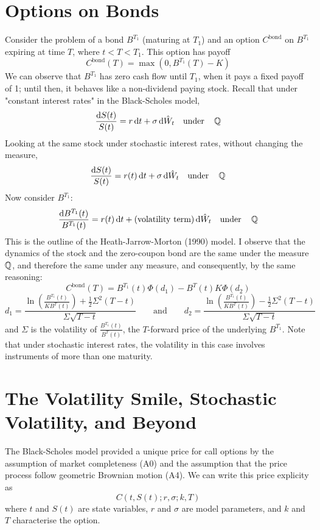 \documentclass[11pt]{article}
\begin{document}
\section{Options on Bonds}

Consider the problem of a bond $B^{T_1}$ (maturing at $T_1$) and an option $C^\text{bond}$ on $B^{T_1}$ expiring at time $T$, where $t < T < T_1$. This option has payoff 
$$C^\text{bond}(T) = \max\left( 0, B^{T_1}(T) - K\right)$$
We can observe that $B^{T_1}$ has zero cash flow until $T_1$, when it pays a fixed payoff of 1; until then, it behaves like a non-dividend paying stock. Recall that under "constant interest rates" in the Black-Scholes model,
$$\frac{\dif S(t)}{S(t)} = r \dif t + \sigma \dif\hat{W}_t \quad \text{under} \quad \Qmeas$$
Looking at the same stock under stochastic interest rates, without changing the measure,
$$\frac{\dif S(t)}{S(t)} = r(t) \dif t + \sigma \dif\hat{W}_t \quad \text{under} \quad \Qmeas$$
Now consider $B^{T_1}$:
$$\frac{\dif B^{T_1}(t)}{B^{T_1}(t)} = r(t) \dif t + \text{(volatility term)} \dif\hat{W}_t \quad \text{under} \quad \Qmeas$$
This is the outline of the Heath-Jarrow-Morton (1990) model.  I observe that the dynamics of the stock and the zero-coupon bond are the same under the measure $\operatorname{\mathbb Q}$, and therefore the same under any measure, and consequently, by the same reasoning:
$$C^\text{bond}(T) = B^{T_1}(t) \Phi(d_1) - B^{T}(t) K \Phi(d_2)$$
$$d_1 = \frac{\ln \left( \frac{B^{T_1}(t)}{K B^T(t)}\right) + \frac{1}{2}\Sigma^2(T-t)}{\Sigma \sqrt{T-t}} \qquad \text{and} \qquad d_2 = \frac{\ln \left( \frac{B^{T_1}(t)}{K B^T(t)}\right) - \frac{1}{2}\Sigma^2(T-t)}{\Sigma \sqrt{T-t}}$$
and $\Sigma$ is the volatility of $\frac{B^{T_1}(t)}{B^T(t)}$, the $T$-forward price of the underlying $B^{T_1}$.  Note that under stochastic interest rates, the volatility in this case involves instruments of more than one maturity.

\section{The Volatility Smile, Stochastic Volatility, and Beyond }

The Black-Scholes model provided a unique price for call options by the assumption of market completeness (A0) and the assumption that the price process follow geometric Brownian motion (A4). We can write this price explicity as 
$$C(t, S(t); r, \sigma; k, T)$$
where $t$ and $S(t)$ are state variables, $r$ and $\sigma$ are model parameters, and $k$ and $T$ characterise the option. \\
\end{document}
